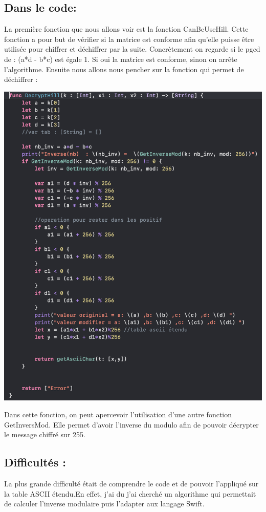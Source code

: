 \documentclass{article}
\begin{document}
\subsection{Dans le code:}
La première fonction que nous allons voir est la fonction CanBeUseHill.
Cette fonction a pour but de vérifier si la matrice est conforme afin qu'elle puisse être utilisée pour chiffrer et déchiffrer par la suite. Concrètement on regarde si le pgcd de :
(a*d - b*c) est égale 1. Si oui la matrice est conforme, sinon on arrête l'algorithme.
\newline Ensuite nous allons nous pencher sur la fonction qui permet de déchiffrer :
 \begin{center}
     \includegraphics[scale=0.5]{HillD.png}
 \end{center}
 Dans cette fonction, on peut apercevoir l'utilisation d'une autre fonction GetInversMod.
 Elle permet d'avoir l'inverse du modulo afin de pouvoir décrypter le message chiffré sur 255.

\subsection{Difficultés :}
La plus grande difficulté était de comprendre le code et de pouvoir l'appliqué sur la table ASCII étendu.En effet, j'ai du j'ai cherché un algorithme qui permettait de calculer l'inverse modulaire puis l'adapter aux langage Swift.
\newpage
\end{document}
